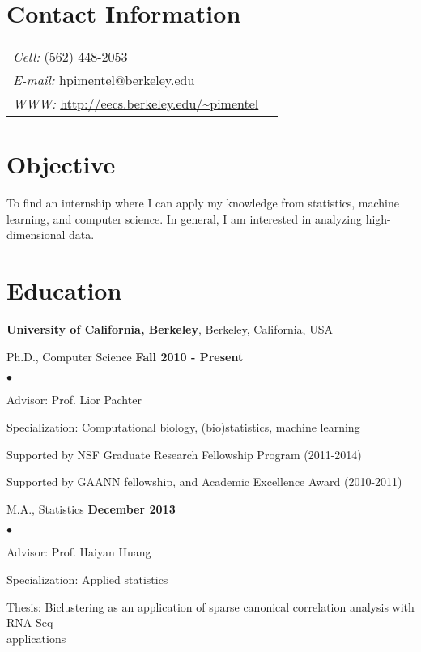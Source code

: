 \documentclass[margin,line]{res}
\newenvironment{list2}{
  \begin{list}{$\bullet$}{%
      \setlength{\itemsep}{0in}
      \setlength{\parsep}{0in} \setlength{\parskip}{0in}
      \setlength{\topsep}{0in} \setlength{\partopsep}{0in} 
      \setlength{\leftmargin}{0.2in}}}{\end{list}}
\begin{document}

\begin{resume}
\section{\sc Contact Information}
\vspace{.05in}
\begin{tabular}{@{}p{4in}p{2in}}
 {\it Cell:}  (562) 448-2053 & \\
 {\it E-mail:}  hpimentel@berkeley.edu & \\       
 {\it WWW:} \url{http://eecs.berkeley.edu/~pimentel} &
\end{tabular}

\section{\sc Objective} 
To find an internship where I can apply my knowledge from statistics, machine
learning, and computer science. In general, I am interested in analyzing
high-dimensional data.

\section{\sc Education}
{\bf University of California, Berkeley}, Berkeley, California, USA

\vspace{-.3cm}
Ph.D., Computer Science \hfill {\bf
 Fall 2010 - Present}\\
\vspace{-.45cm}
\begin{list2}
\vspace*{1mm}
\item Advisor: Prof. Lior Pachter
\item Specialization: Computational biology, (bio)statistics, machine learning
\item Supported by NSF Graduate Research Fellowship Program (2011-2014)
\item Supported by GAANN fellowship, and Academic Excellence Award (2010-2011)
\end{list2}


M.A., Statistics \hfill {\bf
 December 2013}\\
\vspace{-.45cm}
\begin{list2}
\vspace*{1mm}
\item Advisor: Prof. Haiyan Huang
\item Specialization: Applied statistics
\item Thesis: Biclustering as an application of sparse canonical correlation analysis with RNA-Seq \\applications
\end{list2}




\end{resume}
\end{document}
